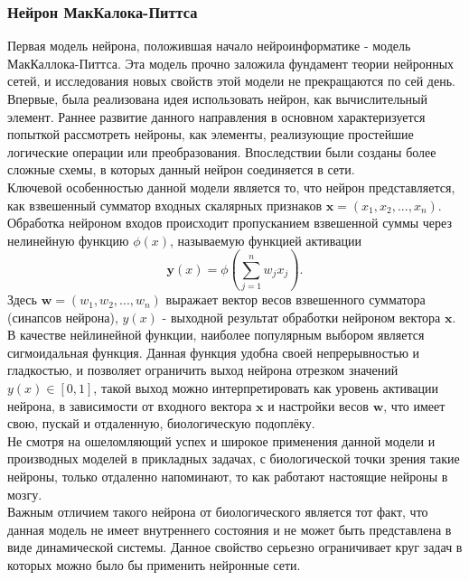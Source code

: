 \documentclass[a4paper,10pt]{article}
\begin{document}
\subsubsection{Нейрон МакКалока-Питтса}
   Первая модель нейрона, положившая начало нейроинформатике  - модель МакКаллока-Питтса. Эта модель прочно заложила фундамент теории нейронных сетей, и исследования новых свойств этой модели не   прекращаются по сей день.\\
   \indent Впервые, была реализована идея использовать нейрон, как вычислительный элемент. Раннее развитие данного направления в основном характеризуется попыткой рассмотреть нейроны, как элементы,        реализующие простейшие логические операции или преобразования. Впоследствии были созданы более сложные схемы, в которых данный нейрон соединяется в сети.\\
   \indent Ключевой особенностью данной модели является то, что нейрон представляется, как взвешенный сумматор входных скалярных признаков $\boldsymbol{x}=(x_{1},x_{2},...,x_{n})$. Обработка нейроном входов происходит пропусканием взвешенной суммы через нелинейную функцию $\phi(x)$, называемую функцией активации\\
   \begin{equation}\label{eq:sum_mp}
   \boldsymbol{y}(x) = \phi(\sum_{j=1}^{n}w_{j}x_{j}).
   \end{equation}
\indent Здесь $\boldsymbol{w}=(w_{1}, w_{2},...,w_{n})$ выражает вектор весов взвешенного сумматора (синапсов нейрона), $y(x)$ - выходной результат обработки нейроном вектора $\boldsymbol{x}$.\\	
	\indent В качестве нейлинейной функции, наиболее популярным выбором является сигмоидальная функция\cite{Zaencev1999}. Данная функция удобна своей непрерывностью и гладкостью, и позволяет ограничить выход нейрона  отрезком значений $y(x)\in[0,1]$, такой выход можно интерпретировать как уровень активации нейрона, в зависимости от входного вектора $\boldsymbol{x}$ и настройки весов $\boldsymbol{w}$, что имеет свою, пускай и отдаленную, биологическую подоплёку. \\
   \indent Не смотря на ошеломляющий успех и широкое применения данной модели  и производных моделей в прикладных задачах, с биологической точки зрения такие нейроны, только отдаленно напоминают, то как работают настоящие нейроны в мозгу.\\
   \indent Важным отличием такого нейрона от биологического является тот факт, что данная модель не имеет внутреннего состояния и не может быть представлена в виде динамической системы\cite{Zaencev1999}. Данное свойство серьезно ограничивает круг задач в которых можно было бы применить нейронные сети. 
\end{document}
